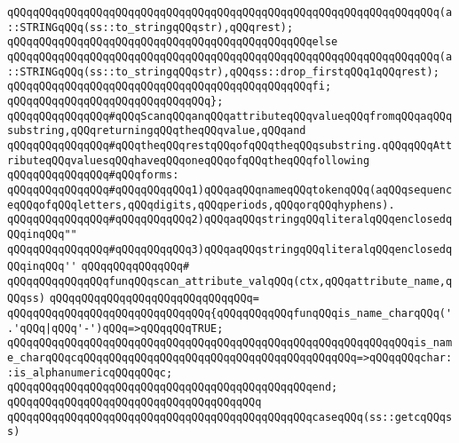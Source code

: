 \verb|qQQqqQQqqQQqqQQqqQQqqQQqqQQqqQQqqQQqqQQqqQQqqQQqqQQqqQQqqQQqqQQqqQQq(a::STRINGqQQq(ss::to_stringqQQqstr),qQQqrest);|\newline
\verb|qQQqqQQqqQQqqQQqqQQqqQQqqQQqqQQqqQQqqQQqqQQqqQQqelse|\newline
\verb|qQQqqQQqqQQqqQQqqQQqqQQqqQQqqQQqqQQqqQQqqQQqqQQqqQQqqQQqqQQqqQQqqQQq(a::STRINGqQQq(ss::to_stringqQQqstr),qQQqss::drop_firstqQQq1qQQqrest);|\newline
\verb|qQQqqQQqqQQqqQQqqQQqqQQqqQQqqQQqqQQqqQQqqQQqqQQqfi;|\newline
\verb|qQQqqQQqqQQqqQQqqQQqqQQqqQQqqQQq};|\newline
\newline
\verb|qQQqqQQqqQQqqQQq#qQQqScanqQQqanqQQqattributeqQQqvalueqQQqfromqQQqaqQQqsubstring,qQQqreturningqQQqtheqQQqvalue,qQQqand|\newline
\verb|qQQqqQQqqQQqqQQq#qQQqtheqQQqrestqQQqofqQQqtheqQQqsubstring.qQQqqQQqAttributeqQQqvaluesqQQqhaveqQQqoneqQQqofqQQqtheqQQqfollowing|\newline
\verb|qQQqqQQqqQQqqQQq#qQQqforms:|\newline
\verb|qQQqqQQqqQQqqQQq#qQQqqQQqqQQq1)qQQqaqQQqnameqQQqtokenqQQq(aqQQqsequenceqQQqofqQQqletters,qQQqdigits,qQQqperiods,qQQqorqQQqhyphens).|\newline
\verb|qQQqqQQqqQQqqQQq#qQQqqQQqqQQq2)qQQqaqQQqstringqQQqliteralqQQqenclosedqQQqinqQQq""|\newline
\verb|qQQqqQQqqQQqqQQq#qQQqqQQqqQQq3)qQQqaqQQqstringqQQqliteralqQQqenclosedqQQqinqQQq''|\newline
\verb|qQQqqQQqqQQqqQQq#|\newline
\verb|qQQqqQQqqQQqqQQqfunqQQqscan_attribute_valqQQq(ctx,qQQqattribute_name,qQQqss)|\newline
\verb|qQQqqQQqqQQqqQQqqQQqqQQqqQQqqQQq=|\newline
\verb|qQQqqQQqqQQqqQQqqQQqqQQqqQQqqQQq{qQQqqQQqqQQqfunqQQqis_name_charqQQq('.'qQQq|\verb#|qQQq'-')qQQq=>qQQqqQQqTRUE;#\newline
\verb|qQQqqQQqqQQqqQQqqQQqqQQqqQQqqQQqqQQqqQQqqQQqqQQqqQQqqQQqqQQqqQQqis_name_charqQQqcqQQqqQQqqQQqqQQqqQQqqQQqqQQqqQQqqQQqqQQqqQQq=>qQQqqQQqchar::is_alphanumericqQQqqQQqc;|\newline
\verb|qQQqqQQqqQQqqQQqqQQqqQQqqQQqqQQqqQQqqQQqqQQqqQQqend;|\newline
\verb|qQQqqQQqqQQqqQQqqQQqqQQqqQQqqQQqqQQqqQQq|\newline
\verb|qQQqqQQqqQQqqQQqqQQqqQQqqQQqqQQqqQQqqQQqqQQqqQQqcaseqQQq(ss::getcqQQqss)|\newline
